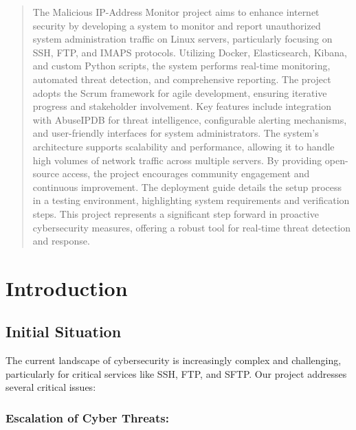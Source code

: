 \documentclass{article}
\begin{document}
    \begin{abstract}
        \noindent The Malicious IP-Address Monitor project aims to enhance internet security by developing a system to monitor and report unauthorized system administration traffic on Linux servers, particularly focusing on SSH, FTP, and IMAPS protocols.
        Utilizing Docker, Elasticsearch, Kibana, and custom Python scripts, the system performs real-time monitoring, automated threat detection, and \newline comprehensive reporting.
        The project adopts the Scrum framework for agile development, ensuring iterative progress and stakeholder involvement. Key features include integration with AbuseIPDB for threat intelligence, configurable alerting mechanisms, and user-friendly interfaces for system administrators.
        The system's architecture supports scalability and performance, allowing it to handle high volumes of network traffic across multiple servers.
        By providing open-source access, the project encourages community engagement and continuous improvement.
        The deployment guide details the setup process in a testing environment, highlighting system requirements and verification steps.
        This project represents a significant step forward in proactive cybersecurity measures, offering a robust tool for real-time threat detection and response.
    \end{abstract}
    \newpage

    \tableofcontents
    \newpage
    \listoftables
    \listoffigures
    \clearpage


    \section{Introduction}\label{sec:introduction}

    \subsection{Initial Situation}\label{subsec:initial-situation}
    The current landscape of cybersecurity is increasingly complex and challenging, particularly for critical services like SSH, FTP, and SFTP. Our project addresses several critical issues:

    \subsubsection{Escalation of Cyber Threats:}
\end{document}
